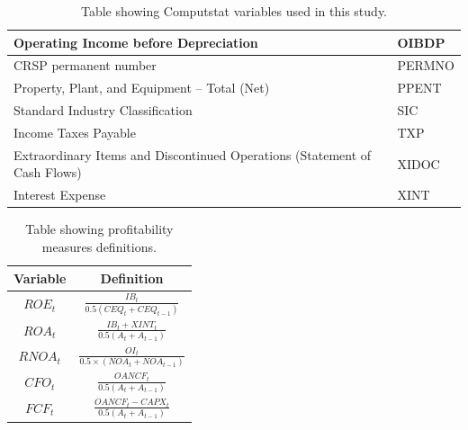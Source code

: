 {\begin{table}[htb!]
\begin{tabular}{|l|l|}
Operating Income before Depreciation                                       & OIBDP         \\ \hline
CRSP permanent number                                                      & PERMNO        \\ \hline
Property, Plant, and Equipment – Total (Net)                               & PPENT         \\ \hline
Standard Industry Classification                                           & SIC           \\ \hline
Income Taxes Payable                                                       & TXP           \\ \hline
Extraordinary Items and Discontinued Operations (Statement of Cash Flows)  & XIDOC         \\ \hline
Interest Expense                                                           & XINT          \\ \hline
\end{tabular}
\caption{Table showing Computstat variables used in this study.}
\label{tab:CompustatVariables}
\end{table}

{\renewcommand{\arraystretch}{2}
\begin{table}[htb!]
\centering
\begin{tabular}{|c|c|}
\hline
\textbf{Variable} & \textbf{Definition}                           \\ \hline
$ROE_t$           & $\frac{IB_t}{0.5(CEQ_t + CEQ_{t-1})}$         \\ \hline
$ROA_t$           & $\frac{IB_t + XINT_t}{0.5(A_t + A_{t-1})}$    \\ \hline
$RNOA_t$          & $\frac{OI_t}{0.5 \times (NOA_t + NOA_{t-1})}$ \\ \hline
$CFO_t$           & $\frac{OANCF_t}{0.5(A_t + A_{t-1})}$          \\ \hline
$FCF_t$           & $\frac{OANCF_t - CAPX_t}{0.5(A_t + A_{t-1})}$ \\ \hline
\end{tabular}
\caption{Table showing profitability measures definitions.}
\label{tab:ProfitMeasures} 

\end{table}


}}
